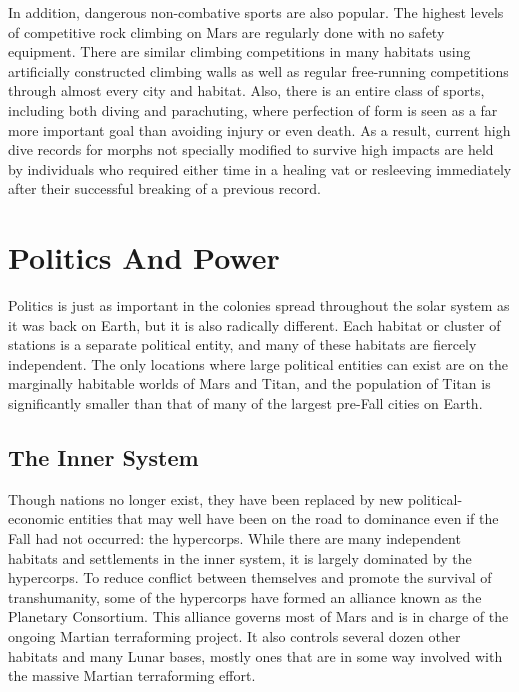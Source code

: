 In addition, dangerous non-combative sports are 
also popular. The highest levels of competitive rock 
climbing on Mars are regularly done with no safety 
equipment. There are similar climbing competitions 
in many habitats using artificially constructed climbing walls as well as regular free-running competitions 
through almost every city and habitat. Also, there is 
an entire class of sports, including both diving and 
parachuting, where perfection of form is seen as 
a far more important goal than avoiding injury or 
even death. As a result, current high dive records for 
morphs not specially modified to survive high impacts 
are held by individuals who required either time in a 
healing vat or resleeving immediately after their successful breaking of a previous record.

\section{Politics And Power}

Politics is just as important in the colonies spread 
throughout the solar system as it was back on Earth, 
but it is also radically different. Each habitat or cluster 
of stations is a separate political entity, and many of 
these habitats are fiercely independent. The only locations where large political entities can exist are on the 
marginally habitable worlds of Mars and Titan, and 
the population of Titan is significantly smaller than 
that of many of the largest pre-Fall cities on Earth.

\subsection{The Inner System}

Though nations no longer exist, they have been replaced by new political-economic entities that may 
well have been on the road to dominance even if the 
Fall had not occurred: the hypercorps. While there 
are many independent habitats and settlements in the 
inner system, it is largely dominated by the hypercorps. 
To reduce conflict between themselves and promote 
the survival of transhumanity, some of the hypercorps 
have formed an alliance known as the Planetary Consortium. This alliance governs most of Mars and is 
in charge of the ongoing Martian terraforming project. It also controls several dozen other habitats and 
many Lunar bases, mostly ones that are in some way 
involved with the massive Martian terraforming effort.

